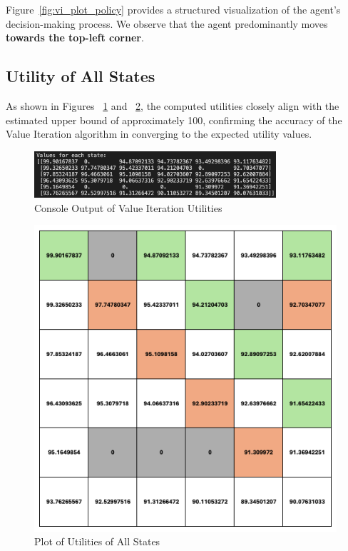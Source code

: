 \noindent Figure~\ref{fig:vi_plot_policy} provides a structured visualization of the agent's decision-making process. We observe that the agent predominantly moves \textbf{towards the top-left corner}.

\subsection{Utility of All States}
As shown in Figures ~\ref{fig:vi_console_utility} and ~\ref{fig:vi_plot_utility}, the computed utilities closely align with the estimated upper bound of approximately 100, confirming the accuracy of the Value Iteration algorithm in converging to the expected utility values.

\begin{figure}[H]
    \centering
    \includegraphics[width=0.8\textwidth]{images/vi_utility.png}
    \caption{Console Output of Value Iteration Utilities}
    \label{fig:vi_console_utility}
\end{figure}

\begin{figure}[H]
    \centering
    \includegraphics[width=1.0\textwidth]{images/vi_plot_utility.png}
    \caption{Plot of Utilities of All States}
    \label{fig:vi_plot_utility}
\end{figure}

